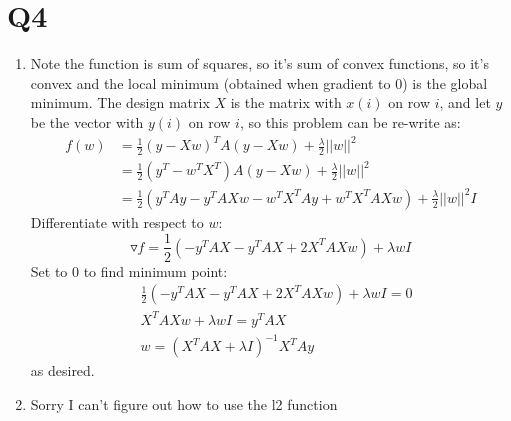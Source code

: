 \documentclass[12pt]{article}
\begin{document}
	\section*{Q4}
	\begin{enumerate}[label=\alph*)]
		\item Note the function is sum of squares, so it's sum of convex functions, so it's convex and the local minimum (obtained when gradient to 0) is the global minimum. The design matrix $X$ is the matrix with $x(i)$ on row $i$, and let $y$ be the vector with $y(i)$ on row $i$, so this problem can be re-write as:
		\begin{align*}
			f(w) &= \frac{1}{2}(y-Xw)^TA(y-Xw)+\frac{\lambda}{2}||w||^2\\
			&=\frac{1}{2}(y^T-w^TX^T)A(y-Xw)+\frac{\lambda}{2}||w||^2\\
			&=\frac{1}{2}(y^TAy-y^TAXw-w^TX^TAy+w^TX^TAXw)+\frac{\lambda}{2}||w||^2I
		\end{align*}
		Differentiate with respect to $w$:
		\[\triangledown f=\frac{1}{2}(-y^TAX-y^TAX+2X^TAXw)+\lambda wI\]
		Set to $0$ to find minimum point:
		\begin{align*} &\frac{1}{2}(-y^TAX-y^TAX+2X^TAXw)+\lambda wI=0\\
			&X^TAXw+\lambda wI=y^TAX\\
			&w=(X^TAX+\lambda I)^{-1}X^TAy
		\end{align*}
	as desired.
		\item Sorry I can't figure out how to use the l2 function
		
	\end{enumerate}
	
	
	
	
	
	
	
\end{document}
